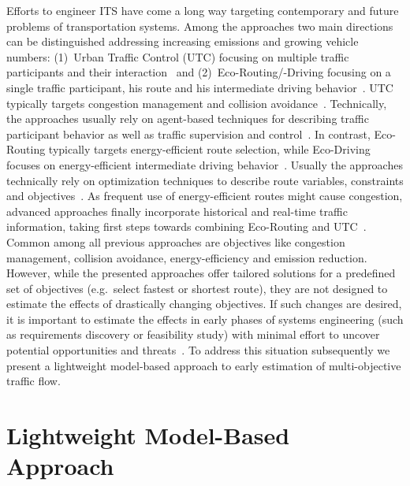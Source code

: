 \documentclass[conference]{../cls/IEEEtran}
\begin{document}
Efforts to engineer ITS have come a long way targeting contemporary and future
problems of transportation systems. Among the approaches two main directions can
be distinguished addressing increasing emissions and growing vehicle numbers:
(1)~Urban Traffic Control (UTC) focusing on multiple traffic participants and
their interaction~\cite{Chen2010} and (2)~Eco-Routing/-Driving focusing
on a single traffic participant, his route and his intermediate driving
behavior~\cite{Ericsson2006,Boriboonsomsin2012}. UTC typically targets
congestion management and collision avoidance~\cite{Chen2010}. Technically, the
approaches usually rely on agent-based techniques for describing traffic
participant behavior as well as traffic supervision and control~\cite{Chen2010}.
In contrast, Eco-Routing typically targets energy-efficient route selection,
while Eco-Driving focuses on energy-efficient intermediate driving
behavior~\cite{Ericsson2006}. Usually the approaches technically rely
on optimization techniques to describe route variables, constraints and
objectives~\cite{Ericsson2006}. As frequent use of energy-efficient routes might
cause congestion, advanced approaches finally incorporate historical and
real-time traffic information, taking first steps towards combining
Eco-Routing and UTC~\cite{Boriboonsomsin2012}. 
Common among all previous approaches are objectives like congestion management,
collision avoidance, energy-efficiency and emission reduction. 
However, while the presented approaches offer tailored solutions for a
predefined set of objectives (e.g.\ select fastest or shortest route), they are not designed to
estimate the effects of drastically changing objectives.
If such changes are desired, it is important to
estimate the effects in early phases of systems engineering (such as
requirements discovery or feasibility study) with minimal effort to uncover
potential opportunities and threats~\cite{Whitten2005}. To address this
situation subsequently we present a lightweight model-based approach to early
estimation of multi-objective traffic flow.

\section{Lightweight Model-Based Approach}
\label{sec:approach}
\end{document}
